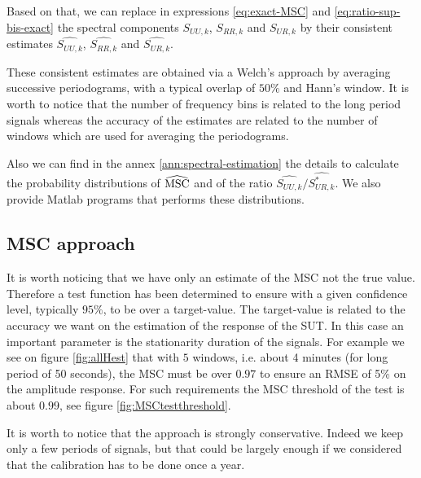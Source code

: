 Based on that, we can replace in expressions \eqref{eq:exact-MSC} and \eqref{eq:ratio-sup-bis-exact} the spectral components $S_{UU,k}$, $S_{RR,k}$ and $S_{UR,k}$ by their consistent estimates $\widehat{S_{UU,k}}$, $\widehat{S_{RR,k}}$ and $\widehat{S_{UR,k}}$.


These consistent estimates are obtained via a Welch's approach by averaging successive periodograms, with a typical overlap of $50\%$ and Hann's window. It is worth to notice that the number of frequency  bins is related to the long period signals whereas the accuracy of the estimates are related to the number of windows which are used for averaging the periodograms.


Also we can find in the annex \ref{ann:spectral-estimation} the details to calculate the probability distributions of $\widehat{\mathrm{MSC}}$ and of the ratio $\widehat{S_{UU,k}}/\widehat{S^*_{UR,k}}$. We also provide Matlab programs that performs these distributions. 

\subsection{MSC approach}

It is worth noticing that we have only an estimate of the MSC not the true value. Therefore a test function has been determined to ensure with a given confidence level, typically $95\%$, to be over a target-value. The target-value is related to the accuracy we want on the estimation of the response of the SUT. In this case an important parameter is the  stationarity duration of the signals. For example we see on figure \ref{fig:allHest} that with $5$ windows, i.e. about 4 minutes (for long period of 50 seconds), the MSC must be over $0.97$ to ensure an RMSE of 5\% on the amplitude response. For such requirements the MSC threshold of the test is about $0.99$, see figure \ref{fig:MSCtestthreshold}.

It is worth to notice that the approach is strongly conservative. Indeed we keep only a few periods of signals, but that could be largely enough if we considered that the calibration has to be done once a year.



